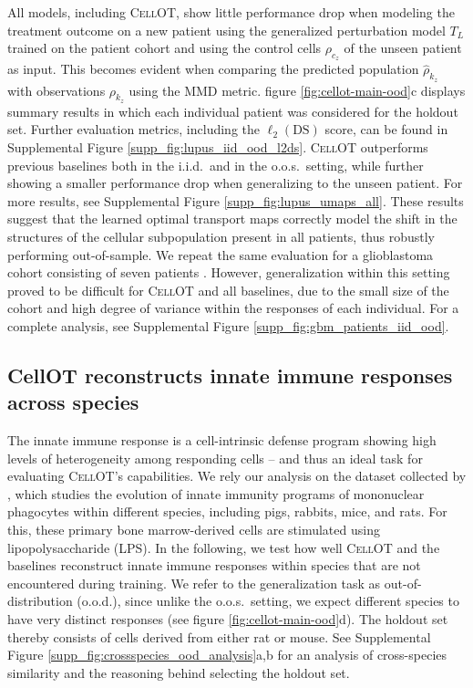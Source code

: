 All models, including \textsc{CellOT}, show little performance drop when modeling the treatment outcome on a new patient using the generalized perturbation model $T_L$ trained on the patient cohort and using the control cells $\rho_{c_z}$ of the unseen patient as input.
This becomes evident when comparing the predicted population $\hat{\rho}_{k_z}$ with observations $\rho_{k_z}$ using the MMD metric. figure \ref{fig:cellot-main-ood}c displays summary results in which each individual patient was considered for the holdout set.
Further evaluation metrics, including the $\ell_2(\text{DS})$ score, can be found in Supplemental Figure \ref{supp_fig:lupus_iid_ood_l2ds}.
\textsc{CellOT} outperforms previous baselines both in the i.i.d.~and in the o.o.s.~setting, while further showing a smaller performance drop when generalizing to the unseen patient.
For more results, see Supplemental Figure \ref{supp_fig:lupus_umaps_all}.
These results suggest that the learned optimal transport maps correctly model the shift in the structures of the cellular subpopulation present in all patients, thus robustly performing out-of-sample.
We repeat the same evaluation for a glioblastoma cohort consisting of seven patients \cite{zhao2021}.
However, generalization within this setting proved to be difficult for \textsc{CellOT} and all baselines, due to the small size of the cohort and high degree of variance within the responses of each individual. 
For a complete analysis, see Supplemental Figure \ref{supp_fig:gbm_patients_iid_ood}.

\subsection{CellOT reconstructs innate immune responses across species}

The innate immune response is a cell-intrinsic defense program showing high levels of heterogeneity among responding cells -- and thus an ideal task for evaluating \textsc{CellOT}'s capabilities.
We rely our analysis on the dataset collected by \citet{hagai2018}, which studies the evolution of innate immunity programs of mononuclear phagocytes within different species, including pigs, rabbits, mice, and rats.
For this, these primary bone marrow-derived cells are stimulated using lipopolysaccharide (LPS).
In the following, we test how well \textsc{CellOT} and the baselines reconstruct innate immune responses within species that are not encountered during training.
We refer to the generalization task as out-of-distribution (o.o.d.), since unlike the o.o.s.~setting, we expect different species to have very distinct responses (see figure \ref{fig:cellot-main-ood}d).
The holdout set thereby consists of cells derived from either rat or mouse. See Supplemental Figure \ref{supp_fig:crossspecies_ood_analysis}a,b for an analysis of cross-species similarity and the reasoning behind selecting the holdout set.

